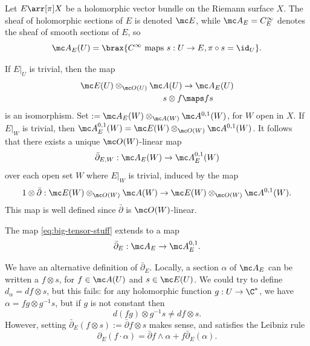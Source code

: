 \documentclass[11pt]{report}
\begin{document}
\begin{defn}[Recall]
Let $E \arr[\pi]X$ be a holomorphic vector bundle on the Riemann surface $X$. The sheaf of holomorphic sections of $E$ is denoted $\mc E$, while $\mc A_E=C^\infty _E$ denotes the sheaf of smooth sections of $E$, so
\[
 \mc A_E(U)= \brax{C^\infty \text{ maps } s:U \to E, \pi\circ s = \id_U}.
\]
\end{defn}
\begin{rmk}
If $E|_U$ is trivial, then the map
\begin{align*}
    \mc E(U) \otimes_{\mc O(U)} \mc A(U) &\to \mc A_E(U) \\
    s \otimes f & \maps fs
\end{align*}
is an isomorphism. Set  $:= \mc A_E(W)\otimes _{\mc A(W)}\mc A^{0,1}(W)$, for $W$ open in $X$. If $E|_W$ is trivial, then $\mc A_E^{0,1}(W) = \mc E(W) \otimes _{\mc O (W)} \mc A^{0,1}(W)$. It follows that there exists a unique $\mc O(W)$-linear map
\[
\bar \partial_{E,W}: \mc A_E(W) \to \mc A_E^{0,1}(W)
\]
over each open set $W$ where $E|_W$ is trivial, induced by the map
\begin{align} \label{eq:big-tensor-stuff}
1 \otimes \bar \partial : \mc E(W) \otimes_{ \mc O(W) } \mc A(W) \to \mc E(W)\otimes _{\mc O(W)} \mc A^{0,1}(W).    
\end{align}
This map is well defined since $\bar \partial$ is $\mc O(W)$-linear.
\end{rmk}

\begin{defn}
 The map \eqref{eq:big-tensor-stuff} extends to a map
\begin{align*}
    \bar \partial_E : \mc A_E \to \mc A_E^{0,1}.
\end{align*}
\end{defn}

\begin{defn}
    We have an alternative definition of $\bar \partial _E$. Locally, a section $\alpha$ of $\mc A_E$ can be written a $f\otimes s$, for $f \in \mc A(U)$ and $s \in \mc E(U)$. We could try to define $d_\alpha = df \otimes s$, but this fails: for any holomorphic function $g:U \to \C^*$, we have $\alpha = fg \otimes g^{-1}s$, but if $g$ is not constant then
    \[
    d(fg) \otimes g^{-1}s \neq df \otimes s.
    \]
    However, setting $\bar \partial_E(f \otimes s):= \bar \partial f \otimes s$ makes sense, and satisfies the Leibniz rule
    \[
    \partial _E(f \cdot \alpha)= \bar \partial f \land \alpha+ f \bar \partial_E (\alpha).
    \]
\end{defn}
\end{document}
